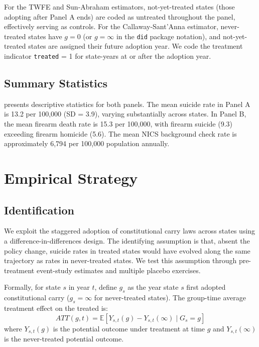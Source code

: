 \documentclass[12pt]{article}
\newcommand{\E}{\mathbb{E}}
\begin{document}
For the TWFE and Sun-Abraham estimators, not-yet-treated states (those adopting after Panel A ends) are coded as untreated throughout the panel, effectively serving as controls. For the Callaway-Sant'Anna estimator, never-treated states have $g = 0$ (or $g = \infty$ in the \texttt{did} package notation), and not-yet-treated states are assigned their future adoption year. We code the treatment indicator \texttt{treated} = 1 for state-years at or after the adoption year.

\subsection{Summary Statistics}

 presents descriptive statistics for both panels. The mean suicide rate in Panel A is 13.2 per 100,000 (SD = 3.9), varying substantially across states. In Panel B, the mean firearm death rate is 15.3 per 100,000, with firearm suicide (9.3) exceeding firearm homicide (5.6). The mean NICS background check rate is approximately 6,794 per 100,000 population annually.




\section{Empirical Strategy}\label{sec:strategy}

\subsection{Identification}

We exploit the staggered adoption of constitutional carry laws across states using a difference-in-differences design. The identifying assumption is that, absent the policy change, suicide rates in treated states would have evolved along the same trajectory as rates in never-treated states. We test this assumption through pre-treatment event-study estimates and multiple placebo exercises.

Formally, for state $s$ in year $t$, define $g_s$ as the year state $s$ first adopted constitutional carry ($g_s = \infty$ for never-treated states). The group-time average treatment effect on the treated is:
\begin{equation}
ATT(g,t) = \E[Y_{s,t}(g) - Y_{s,t}(\infty) \mid G_s = g]
\end{equation}
where $Y_{s,t}(g)$ is the potential outcome under treatment at time $g$ and $Y_{s,t}(\infty)$ is the never-treated potential outcome.
\end{document}
